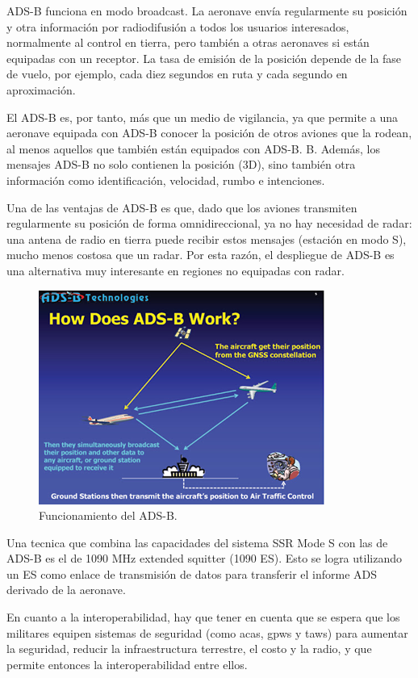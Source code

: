 \begin{enumerate}
\begin{enumerate}
        ADS-B funciona en modo broadcast. La aeronave envía regularmente su posición y otra información por radiodifusión a todos los usuarios interesados, normalmente al control en tierra, pero también a otras aeronaves si están equipadas con un receptor. La tasa de emisión de la posición depende de la fase de vuelo, por ejemplo, cada diez segundos en ruta y cada segundo en aproximación.
        
        El ADS-B es, por tanto, más que un medio de vigilancia, ya que permite a una aeronave equipada con ADS-B conocer la posición de otros aviones que la rodean, al menos aquellos que también están equipados con ADS-B. B. Además, los mensajes ADS-B no solo contienen la posición (3D), sino también otra información como identificación, velocidad, rumbo e intenciones.
        
        Una de las ventajas de ADS-B es que, dado que los aviones transmiten regularmente su posición de forma omnidireccional, ya no hay necesidad de radar: una antena de radio en tierra puede recibir estos mensajes (estación en modo S), mucho menos costosa que un radar. Por esta razón, el despliegue de ADS-B es una alternativa muy interesante en regiones no equipadas con radar.

        
        \begin{figure}[H]
            \centering
            \includegraphics[width=0.5\linewidth]{figuras/adsb.png}
            \caption{Funcionamiento del ADS-B.}
            \label{fig:adsb}
        \end{figure}
        
        Una tecnica que combina las capacidades del sistema SSR Mode S con las de ADS-B es el de 1090 MHz extended squitter (1090 ES). Esto se logra utilizando un ES como enlace de transmisión de datos para transferir el informe ADS derivado de la aeronave.
        
        En cuanto a la interoperabilidad, hay que tener en cuenta que se espera que los militares equipen sistemas de seguridad (como \acrfull{acas}, \acrfull{gpws} y \acrfull{taws}) para aumentar la seguridad, reducir la infraestructura terrestre, el costo y la radio, y que permite entonces la interoperabilidad entre ellos.
        

\end{enumerate}
\end{enumerate}
